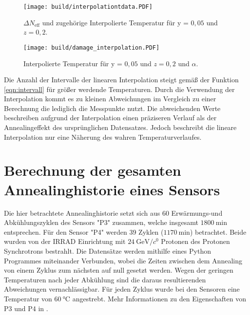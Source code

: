 \begin{figure}
    \texttt{[image: build/interpolationtdata.PDF]}
\caption{$\Delta N_{\mathrm{eff}}$ und zugehörige Interpolierte Temperatur für y = $0,05$ und $z=0,2$.}
\label{fig:interpolation_N_eff}
\end{figure}



\begin{figure}
  \centering
    \texttt{[image: build/damage\_interpolation.PDF]}
\caption{Interpolierte Temperatur für y = $0,05$ und $z=0,2$ und $\alpha$.}
\label{fig:interpolation_damage}
\end{figure}

Die Anzahl der Intervalle der linearen Interpolation steigt gemäß der Funktion \ref{eqn:intervall}
für größer werdende Temperaturen. Durch die Verwendung der Interpolation kommt es zu kleinen Abweichungen im
Vergleich zu einer Berechnung die lediglich die Messpunkte nutzt.
Die abweichenden Werte beschreiben
aufgrund der Interpolation einen präziseren Verlauf als der Annealingeffekt des ursprünglichen Datensatzes.
Jedoch beschreibt die lineare Interpolation nur eine Näherung des wahren Temperaturverlaufes.

\section{Berechnung der gesamten Annealinghistorie eines Sensors}
Die hier betrachtete Annealinghistorie setzt sich aus 60 Erwärmungs-und
Abkühlungszyklen des Sensors "P3" zusammen, welche insgesamt $\SI{1800}{\minute}$ entsprechen.
Für den Sensor "P4" werden 39 Zyklen ($\SI{1170}{\minute}$) betrachtet.
Beide wurden von der ${\mathrm{IRRAD}}$ Einrichtung mit $\SI{24}{\giga\eV\per\clight}$ Protonen des Protonen Synchrotrons bestrahlt.
Die Datensätze werden mithilfe eines Python Programmes miteinander Verbunden,
wobei die Zeiten zwischen dem Annealing von einem Zyklus zum nächsten auf null gesetzt werden. Wegen der geringen
Temperaturen nach jeder Abkühlung sind die daraus resultierenden Abweichungen vernachlässigbar.
Für jeden Zyklus wurde bei den Sensoren eine Temperatur von $\SI{60}{\celsius}$ angestrebt.
Mehr Informationen zu den Eigenschaften von P3 und P4 in  \cite{felix}.


